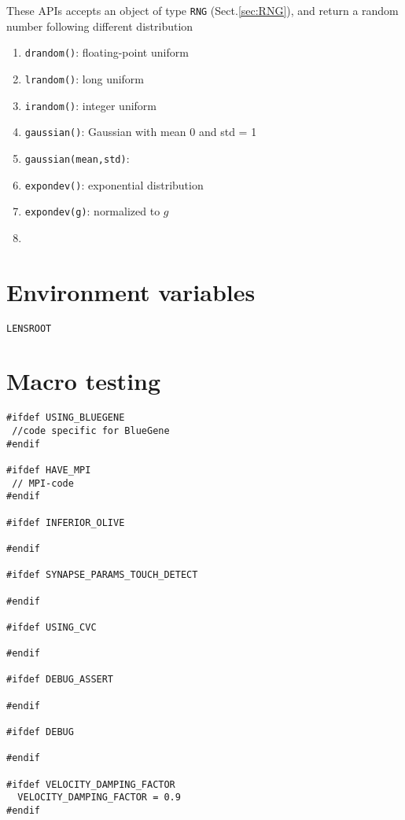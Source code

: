 These APIs accepts an object of type \verb!RNG! (Sect.\ref{sec:RNG}), and
return a random number following different distribution

\begin{enumerate}
  \item \verb!drandom()!: floating-point uniform
  
  \item \verb!lrandom()!: long uniform
  
  \item \verb!irandom()!: integer uniform
  
  \item \verb!gaussian()!: Gaussian with mean 0 and std = 1
  
  \item \verb!gaussian(mean,std)!: 
  
  \item \verb!expondev()!: exponential distribution
  
  \item \verb!expondev(g)!: normalized to $g$
  \item 
\end{enumerate}

\section{Environment variables}

\begin{verbatim}
LENSROOT
\end{verbatim}


\section{Macro testing}

\begin{verbatim}
#ifdef USING_BLUEGENE
 //code specific for BlueGene
#endif

#ifdef HAVE_MPI
 // MPI-code
#endif

#ifdef INFERIOR_OLIVE

#endif

#ifdef SYNAPSE_PARAMS_TOUCH_DETECT

#endif

#ifdef USING_CVC

#endif

#ifdef DEBUG_ASSERT

#endif

#ifdef DEBUG

#endif

#ifdef VELOCITY_DAMPING_FACTOR
  VELOCITY_DAMPING_FACTOR = 0.9 
#endif
\end{verbatim}


